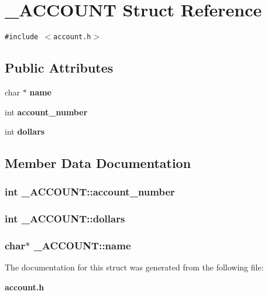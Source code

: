 \section{\_\-ACCOUNT Struct Reference}
\label{struct__ACCOUNT}
{\tt \#include $<$account.h$>$}

\subsection*{Public Attributes}
\begin{CompactItemize}
\item 
char $\ast$ \bf{name}
\item 
int \bf{account\_\-number}
\item 
int \bf{dollars}
\end{CompactItemize}


\subsection{Member Data Documentation}
\subsubsection{\setlength{\rightskip}{0pt plus 5cm}int \bf{\_\-ACCOUNT::account\_\-number}}\label{struct__ACCOUNT_d21175cb511d89f9cf616efdf1e3b6fd}


\subsubsection{\setlength{\rightskip}{0pt plus 5cm}int \bf{\_\-ACCOUNT::dollars}}\label{struct__ACCOUNT_1ed3f424d7d4f889373b0b88112dde6d}


\subsubsection{\setlength{\rightskip}{0pt plus 5cm}char$\ast$ \bf{\_\-ACCOUNT::name}}\label{struct__ACCOUNT_33d36cf0278538fa5413c89eaa4b0277}




The documentation for this struct was generated from the following file:\begin{CompactItemize}
\item 
\bf{account.h}\end{CompactItemize}
